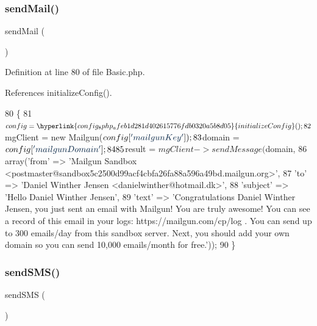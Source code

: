 \subsubsection{\texorpdfstring{send\+Mail()}{sendMail()}}
{\footnotesize\ttfamily send\+Mail (\begin{DoxyParamCaption}{ }\end{DoxyParamCaption})}



Definition at line 80 of file Basic.\+php.



References initialize\+Config().


\begin{DoxyCode}
80                                \{
81         $config = \hyperlink{config_8php_afeb1d281d402615776fdb0320a5b8d05}{initializeConfig}();
82         $mgClient = \textcolor{keyword}{new} Mailgun($config[\textcolor{stringliteral}{'mailgunKey'}]);
83         $domain = $config[\textcolor{stringliteral}{'mailgunDomain'}];
84 
85         $result = $mgClient->sendMessage($domain,
86             array(\textcolor{stringliteral}{'from'}    => \textcolor{stringliteral}{'Mailgun Sandbox
       <postmaster@sandbox5c2500d99acf4cbfa26fa88a596a49bd.mailgun.org>'},
87                 \textcolor{stringliteral}{'to'}      => \textcolor{stringliteral}{'Daniel Winther Jensen <danielwinther@hotmail.dk>'},
88                 \textcolor{stringliteral}{'subject'} => \textcolor{stringliteral}{'Hello Daniel Winther Jensen'},
89                 \textcolor{stringliteral}{'text'}    => \textcolor{stringliteral}{'Congratulations Daniel Winther Jensen, you just sent an email with Mailgun! 
       You are truly awesome!  You can see a record of this email in your logs: https://mailgun.com/cp/log .  You
       can send up to 300 emails/day from this sandbox server.  Next, you should add your own domain so you can send
       10,000 emails/month for free.'}));
90     \}
\end{DoxyCode}
\hypertarget{class_basic_a624b6482127c1e3ea78392e7e93db949}{}\label{class_basic_a624b6482127c1e3ea78392e7e93db949} 
\subsubsection{\texorpdfstring{send\+S\+M\+S()}{sendSMS()}}
{\footnotesize\ttfamily send\+S\+MS (\begin{DoxyParamCaption}{ }\end{DoxyParamCaption})}



